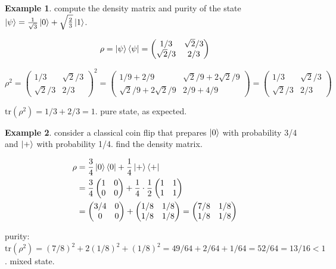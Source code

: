 \documentclass[11pt,a4paper]{article}
\theoremstyle{definition}
\newtheorem{example}{Example}[section]
\theoremstyle{remark}
\begin{document}
\begin{example}
compute the density matrix and purity of the state $\ket{\psi} = \frac{1}{\sqrt{3}}\ket{0} + \sqrt{\frac{2}{3}}\ket{1}$.

\[
\rho = \ket{\psi}\bra{\psi} = \begin{pmatrix} 1/3 & \sqrt{2}/3 \\ \sqrt{2}/3 & 2/3 \end{pmatrix}
\]

\[
\rho^2 = \begin{pmatrix} 1/3 & \sqrt{2}/3 \\ \sqrt{2}/3 & 2/3 \end{pmatrix}^2 = \begin{pmatrix} 1/9 + 2/9 & \sqrt{2}/9 + 2\sqrt{2}/9 \\ \sqrt{2}/9 + 2\sqrt{2}/9 & 2/9 + 4/9 \end{pmatrix} = \begin{pmatrix} 1/3 & \sqrt{2}/3 \\ \sqrt{2}/3 & 2/3 \end{pmatrix}
\]

$\text{tr}(\rho^2) = 1/3 + 2/3 = 1$. pure state, as expected.
\end{example}

\begin{example}
consider a classical coin flip that prepares $\ket{0}$ with probability 3/4 and $\ket{+}$ with probability 1/4. find the density matrix.

\begin{align}
\rho &= \frac{3}{4}\ket{0}\bra{0} + \frac{1}{4}\ket{+}\bra{+} \\
&= \frac{3}{4}\begin{pmatrix} 1 & 0 \\ 0 & 0 \end{pmatrix} + \frac{1}{4} \cdot \frac{1}{2}\begin{pmatrix} 1 & 1 \\ 1 & 1 \end{pmatrix} \\
&= \begin{pmatrix} 3/4 & 0 \\ 0 & 0 \end{pmatrix} + \begin{pmatrix} 1/8 & 1/8 \\ 1/8 & 1/8 \end{pmatrix} = \begin{pmatrix} 7/8 & 1/8 \\ 1/8 & 1/8 \end{pmatrix}
\end{align}

purity: $\text{tr}(\rho^2) = (7/8)^2 + 2(1/8)^2 + (1/8)^2 = 49/64 + 2/64 + 1/64 = 52/64 = 13/16 < 1$. mixed state.
\end{example}
\end{document}
